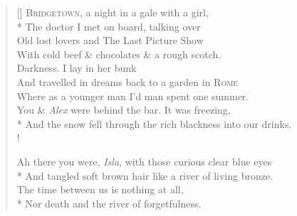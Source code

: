 \settowidth{\versewidth}{Where as a younger man I'd man spent one summer.}
\begin{verse}[\versewidth]
\textsc{Bridgetown}, a night in a gale with a girl,\\*
The doctor I met on board, talking over\\
Old lost lovers and {\hoskeroe The Last Picture Show}\\
With cold beef \& chocolates \& a rough scotch.\\
Darkness. I lay in her bunk\\
And travelled in dreams back to a garden in \textsc{Rome}\\
Where as a younger man I'd man spent one summer.\\
You \& \textit{Alex} were behind the bar. It was freezing,\\*
And the snow fell through the rich blackness into our drinks.\\!

Ah there you were, \textit{Isla}, with those curious clear blue eyes\\*
And tangled soft brown hair like a river of living bronze.\\
The time between us is nothing at all,\\*
Nor death and the river of forgetfulness.
\end{verse}
